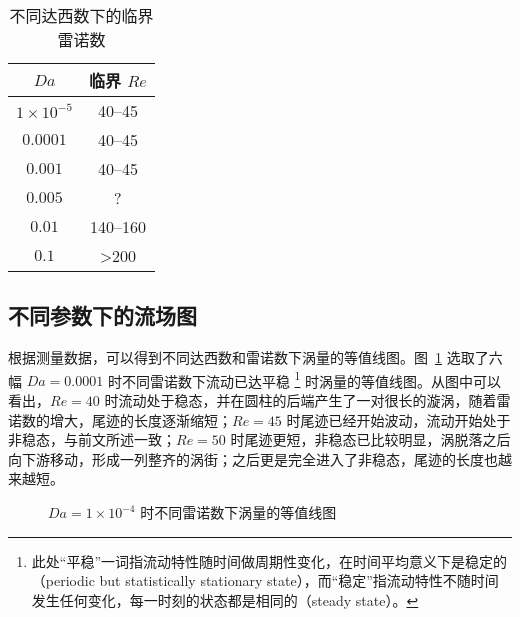 \begin{table}[h]
	\caption{不同达西数下的临界雷诺数}\label{tab: critical Re}
	\vspace{.5em}\centering\wuhao
	\begin{tabular}{cc}
		\toprule[1.5pt]
		$Da$ & 临界 $Re$ \\
		\midrule[1pt]
		$1\times 10^{-5}$ & 40--45 \\
		$0.0001$ & 40--45 \\
		$0.001$ & 40--45 \\
		$0.005$ & ? \\
		$0.01$ & 140--160 \\
		$0.1$ & >200 \\
	\bottomrule[1.5pt]
	\end{tabular}
\end{table}

\subsection{不同参数下的流场图}

根据测量数据，可以得到不同达西数和雷诺数下涡量的等值线图。图~\ref{fig: vorticity-contour-1e-4} 选取了六幅 $Da=0.0001$ 时不同雷诺数下流动已达平稳 \footnote{此处“平稳”一词指流动特性随时间做周期性变化，在时间平均意义下是稳定的（periodic but statistically stationary state），而“稳定”指流动特性不随时间发生任何变化，每一时刻的状态都是相同的（steady state）。} 时涡量的等值线图。从图中可以看出，$Re=40$ 时流动处于稳态，并在圆柱的后端产生了一对很长的漩涡，随着雷诺数的增大，尾迹的长度逐渐缩短；$Re=45$ 时尾迹已经开始波动，流动开始处于非稳态，与前文所述一致；$Re=50$ 时尾迹更短，非稳态已比较明显，涡脱落之后向下游移动，形成一列整齐的涡街；之后更是完全进入了非稳态，尾迹的长度也越来越短。


\begin{figure}
	\centering
	\begin{minipage}{\textwidth}
		\centering
	\end{minipage}
	\centering
	\begin{minipage}{\textwidth}
		\centering
	\end{minipage}
	\centering
	\begin{minipage}{\textwidth}
		\centering
	\end{minipage}
	\caption{$Da=1\times 10^{-4}$ 时不同雷诺数下涡量的等值线图}
	\label{fig: vorticity-contour-1e-4}
\end{figure}


